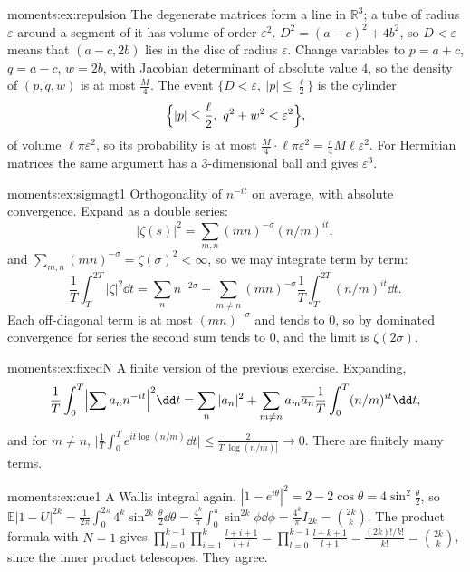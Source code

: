 \begin{solution}{moments:ex:repulsion}
\idea The degenerate matrices form a line in $\mathbb R^3$; a tube of radius $\varepsilon$ around a segment of it has volume of order $\varepsilon^2$.
\writeup $D^2=(a-c)^2+4b^2$, so $D<\varepsilon$ means that $(a-c,2b)$ lies in the disc of radius $\varepsilon$. Change variables to $p=a+c$, $q=a-c$, $w=2b$, with Jacobian
determinant of absolute value $4$, so the density of $(p,q,w)$ is at most $\frac M4$. The event $\{D<\varepsilon,\ |p|\le\frac\ell2\}$ is the cylinder
\[
\Bigl\{|p|\le\frac\ell2,\ q^2+w^2<\varepsilon^2\Bigr\},
\]
of volume $\ell\pi\varepsilon^2$, so its probability is at most
$\frac M4\cdot\ell\pi\varepsilon^2=\frac\pi4M\ell\varepsilon^2$. For Hermitian matrices the same argument has a $3$-dimensional ball and gives
$\varepsilon^3$.
\end{solution}

\begin{solution}{moments:ex:sigmagt1}
\idea Orthogonality of $n^{-it}$ on average, with absolute convergence.
\writeup Expand as a double series:
\[
|\zeta(s)|^2=\sum_{m,n}(mn)^{-\sigma}(n/m)^{it},
\]
and $\sum_{m,n}(mn)^{-\sigma}=\zeta(\sigma)^2<\infty$, so we may integrate term by term:
\[
\frac1T\int_T^{2T}|\zeta|^2\dd t=\sum_n n^{-2\sigma}+\sum_{m\ne n}(mn)^{-\sigma}\frac1T\int_T^{2T}(n/m)^{it}\dd t.
\]
Each off-diagonal term is at most $(mn)^{-\sigma}$ and
tends to $0$, so by dominated convergence for series the second sum tends to $0$, and the limit is $\zeta(2\sigma)$.
\end{solution}

\begin{solution}{moments:ex:fixedN}
\idea A finite version of the previous exercise.
\writeup Expanding,
\[
\frac1T\int_0^T\Bigl|\sum a_nn^{-it}\Bigr|^2\dd t=\sum_n|a_n|^2+\sum_{m\ne n}a_m\overline{a_n}\frac1T\int_0^T(n/m)^{it}\dd t,
\]
and for $m\ne n$,
$\bigl|\frac1T\int_0^Te^{it\log(n/m)}\dd t\bigr|\le\frac2{T|\log(n/m)|}\to0$. There are finitely many terms.
\end{solution}

\begin{solution}{moments:ex:cue1}
\idea A Wallis integral again.
\writeup $|1-e^{i\theta}|^2=2-2\cos\theta=4\sin^2\frac\theta2$, so $\mathbb E|1-U|^{2k}=\frac1{2\pi}\int_0^{2\pi}4^k\sin^{2k}\frac\theta2\dd\theta=\frac{4^k}\pi\int_0^\pi\sin^{2k}\phi\dd\phi=\frac{4^k}\pi I_{2k}=\binom{2k}k$.
The product formula with $N=1$ gives $\prod_{l=0}^{k-1}\prod_{i=1}^k\frac{l+i+1}{l+i}=\prod_{l=0}^{k-1}\frac{l+k+1}{l+1}=\frac{(2k)!/k!}{k!}=\binom{2k}k$, since the inner product telescopes. They agree.
\end{solution}

